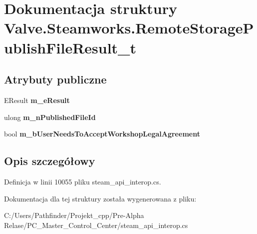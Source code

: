 \hypertarget{struct_valve_1_1_steamworks_1_1_remote_storage_publish_file_result__t}{}\section{Dokumentacja struktury Valve.\+Steamworks.\+Remote\+Storage\+Publish\+File\+Result\+\_\+t}
\label{struct_valve_1_1_steamworks_1_1_remote_storage_publish_file_result__t}
\subsection*{Atrybuty publiczne}
\begin{DoxyCompactItemize}
\item 
\mbox{\label{struct_valve_1_1_steamworks_1_1_remote_storage_publish_file_result__t_ad92d7e5e27fa577e0b56f327a28addf4}} 
E\+Result {\bfseries m\+\_\+e\+Result}
\item 
\mbox{\label{struct_valve_1_1_steamworks_1_1_remote_storage_publish_file_result__t_aee77c0d72f1e5ad3829b1f93605d502b}} 
ulong {\bfseries m\+\_\+n\+Published\+File\+Id}
\item 
\mbox{\label{struct_valve_1_1_steamworks_1_1_remote_storage_publish_file_result__t_a4497bfed3667e529c7ce0682e32a4679}} 
bool {\bfseries m\+\_\+b\+User\+Needs\+To\+Accept\+Workshop\+Legal\+Agreement}
\end{DoxyCompactItemize}


\subsection{Opis szczegółowy}


Definicja w linii 10055 pliku steam\+\_\+api\+\_\+interop.\+cs.



Dokumentacja dla tej struktury została wygenerowana z pliku\+:\begin{DoxyCompactItemize}
\item 
C\+:/\+Users/\+Pathfinder/\+Projekt\+\_\+cpp/\+Pre-\/\+Alpha Relase/\+P\+C\+\_\+\+Master\+\_\+\+Control\+\_\+\+Center/steam\+\_\+api\+\_\+interop.\+cs\end{DoxyCompactItemize}
